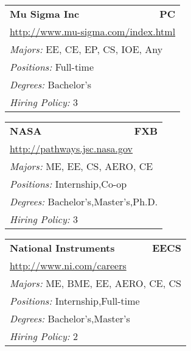 \documentclass[twoside]{article}
\begin{document}
\begin{center}
\begin{multicols}{3}
\begin{FlushLeft}
\begin{minipage}{.9\columnwidth}
\end{minipage}
 
\begin{minipage}{.9\columnwidth}\begin{tabularx}{.95\columnwidth}{Xr}
                 {\Large\bf Mu Sigma Inc} & {\Large\bf PC}\\
    \multicolumn{2}{p{.95\columnwidth}}{\url{http://www.mu-sigma.com/index.html}}\\
    \multicolumn{2}{p{.95\columnwidth}}{\emph{Majors:} EE, CE, EP, CS, IOE, Any}\\
    \multicolumn{2}{p{.95\columnwidth}}{\emph{Positions:} Full-time}\\
    \multicolumn{2}{p{.95\columnwidth}}{\emph{Degrees:} Bachelor's}\\
    \multicolumn{2}{p{.95\columnwidth}}{\emph{Hiring Policy:} 3}\\
    \end{tabularx}
    
\end{minipage}
 
\begin{minipage}{.9\columnwidth}\begin{tabularx}{.95\columnwidth}{Xr}
                 {\Large\bf NASA} & {\Large\bf FXB}\\
    \multicolumn{2}{p{.95\columnwidth}}{\url{http://pathways.jsc.nasa.gov}}\\
    \multicolumn{2}{p{.95\columnwidth}}{\emph{Majors:} ME, EE, CS, AERO, CE}\\
    \multicolumn{2}{p{.95\columnwidth}}{\emph{Positions:} Internship,Co-op}\\
    \multicolumn{2}{p{.95\columnwidth}}{\emph{Degrees:} Bachelor's,Master's,Ph.D.}\\
    \multicolumn{2}{p{.95\columnwidth}}{\emph{Hiring Policy:} 3}\\
    \end{tabularx}
    
\end{minipage}
 
\begin{minipage}{.9\columnwidth}\begin{tabularx}{.95\columnwidth}{Xr}
                 {\Large\bf National Instruments} & {\Large\bf EECS}\\
    \multicolumn{2}{p{.95\columnwidth}}{\url{http://www.ni.com/careers}}\\
    \multicolumn{2}{p{.95\columnwidth}}{\emph{Majors:} ME, BME, EE, AERO, CE, CS}\\
    \multicolumn{2}{p{.95\columnwidth}}{\emph{Positions:} Internship,Full-time}\\
    \multicolumn{2}{p{.95\columnwidth}}{\emph{Degrees:} Bachelor's,Master's}\\
    \multicolumn{2}{p{.95\columnwidth}}{\emph{Hiring Policy:} 2}\\
    \end{tabularx}
    

\end{minipage}
\end{FlushLeft}
\end{multicols}
\end{center}
\end{document}
